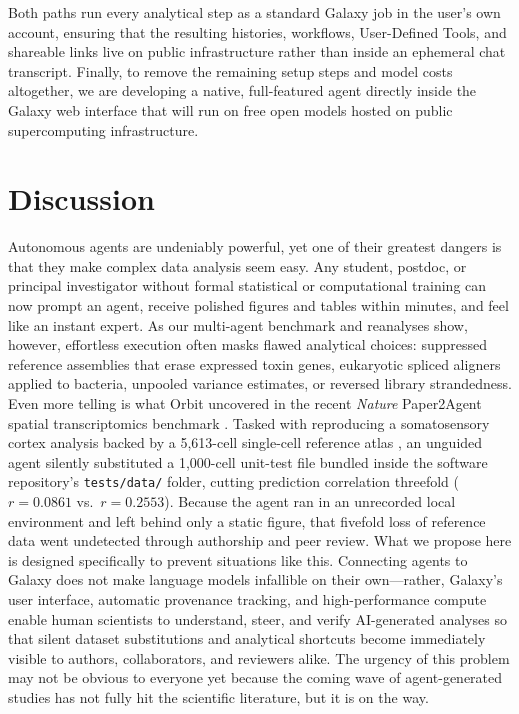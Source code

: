 \documentclass[11pt,letterpaper]{article}
\begin{document}
Both paths run every analytical step as a standard Galaxy job in the user's own account, ensuring that the resulting histories, workflows, User-Defined Tools, and shareable links live on public infrastructure rather than inside an ephemeral chat transcript. Finally, to remove the remaining setup steps and model costs altogether, we are developing a native, full-featured agent directly inside the Galaxy web interface that will run on free open models hosted on public supercomputing infrastructure.

\clearpage
\section{Discussion}

Autonomous agents are undeniably powerful, yet one of their greatest dangers is that they make complex data analysis seem easy. Any student, postdoc, or principal investigator without formal statistical or computational training can now prompt an agent, receive polished figures and tables within minutes, and feel like an instant expert. As our multi-agent benchmark and reanalyses show, however, effortless execution often masks flawed analytical choices: suppressed reference assemblies that erase expressed toxin genes, eukaryotic spliced aligners applied to bacteria, unpooled variance estimates, or reversed library strandedness. Even more telling is what Orbit uncovered in the recent \textit{Nature} Paper2Agent spatial transcriptomics benchmark \cite{miao2026}. Tasked with reproducing a somatosensory cortex analysis backed by a 5,613-cell single-cell reference atlas \cite{sun2024}, an unguided agent silently substituted a 1,000-cell unit-test file bundled inside the software repository's \texttt{tests/data/} folder, cutting prediction correlation threefold ($r = 0.0861$ vs.\ $r = 0.2553$). Because the agent ran in an unrecorded local environment and left behind only a static figure, that fivefold loss of reference data went undetected through authorship and peer review. What we propose here is designed specifically to prevent situations like this. Connecting agents to Galaxy does not make language models infallible on their own---rather, Galaxy's user interface, automatic provenance tracking, and high-performance compute enable human scientists to understand, steer, and verify AI-generated analyses so that silent dataset substitutions and analytical shortcuts become immediately visible to authors, collaborators, and reviewers alike. The urgency of this problem may not be obvious to everyone yet because the coming wave of agent-generated studies has not fully hit the scientific literature, but it is on the way.
\end{document}
